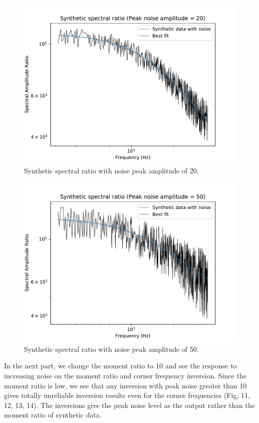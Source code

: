 \documentclass[11pt]{article}
\begin{document}
\begin{figure}[!htb]
    \centering
    \includegraphics[scale=0.7]{fig_freq_noise_3.pdf}
    \caption{Synthetic spectral ratio with noise peak amplitude of 20.}
\end{figure}
\begin{figure}[!htb]
    \centering
    \includegraphics[scale=0.7]{fig_freq_noise_4.pdf}
    \caption{Synthetic spectral ratio with noise peak amplitude of 50.}
\end{figure}

In the next part, we change the moment ratio to 10 and see the response to increasing noise on the moment ratio and corner frequency inversion. Since the moment ratio is low, we see that any inversion with peak noise greater than 10 gives totally unreliable inversion results even for the corner frequencies (Fig, 11, 12, 13, 14). The inversions give the peak noise level as the output rather than the moment ratio of synthetic data.
\end{document}

